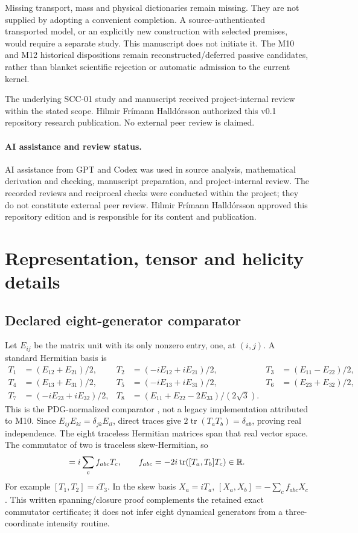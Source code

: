 \documentclass[11pt,a4paper]{article}
\numberwithin{equation}{section}
\newcommand{\tr}{\operatorname{tr}}\newcommand{\diag}{\operatorname{diag}}
\begin{document}
Missing transport, mass and physical dictionaries remain missing. They are not supplied by adopting a convenient completion. A source-authenticated transported model, or an explicitly new construction with selected premises, would require a separate study. This manuscript does not initiate it. The M10 and M12 historical dispositions remain reconstructed/deferred passive candidates, rather than blanket scientific rejection or automatic admission to the current kernel.

The underlying SCC-01 study and manuscript received project-internal review within the stated scope. Hilmir Frímann Halldórsson authorized this v0.1 repository research publication. No external peer review is claimed.

\paragraph{AI assistance and review status.}
AI assistance from GPT and Codex was used in source analysis, mathematical derivation and checking, manuscript preparation, and project-internal review. The recorded reviews and reciprocal checks were conducted within the project; they do not constitute external peer review. Hilmir Frímann Halldórsson approved this repository edition and is responsible for its content and publication.

\appendix
\section{Representation, tensor and helicity details}\label{app:rep}
\subsection{Declared eight-generator comparator}
Let $E_{ij}$ be the matrix unit with its only nonzero entry, one, at $(i,j)$. A standard Hermitian basis is
\begin{align}
 T_1&=(E_{12}+E_{21})/2,&T_2&=(-iE_{12}+iE_{21})/2,&T_3&=(E_{11}-E_{22})/2,\nonumber\\
 T_4&=(E_{13}+E_{31})/2,&T_5&=(-iE_{13}+iE_{31})/2,&T_6&=(E_{23}+E_{32})/2,\label{eq:generators}\\
 T_7&=(-iE_{23}+iE_{32})/2,&T_8&=(E_{11}+E_{22}-2E_{33})/(2\sqrt3).\nonumber
\end{align}
This is the PDG-normalized comparator \cite[p. 3]{pdgsu3}, not a legacy implementation attributed to M10. Since $E_{ij}E_{kl}=\delta_{jk}E_{il}$, direct traces give $2\tr(T_aT_b)=\delta_{ab}$, proving real independence. The eight traceless Hermitian matrices span that real vector space. The commutator of two is traceless skew-Hermitian, so
\begin{equation}
 [T_a,T_b]=i\sum_c f_{abc}T_c,\qquad f_{abc}=-2i\tr([T_a,T_b]T_c)\in\R.
\end{equation}
For example $[T_1,T_2]=iT_3$. In the skew basis $X_a=iT_a$, $[X_a,X_b]=-\sum_c f_{abc}X_c$. This written spanning/closure proof complements the retained exact commutator certificate; it does not infer eight dynamical generators from a three-coordinate intensity routine.
\end{document}
